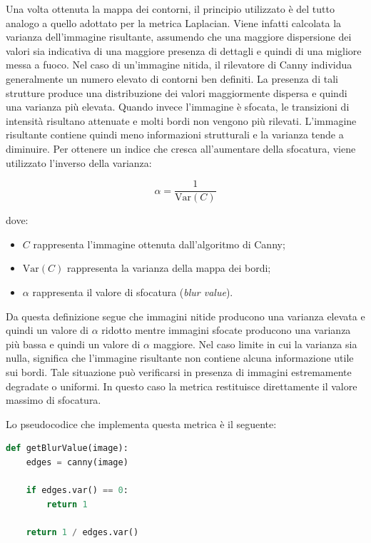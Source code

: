\documentclass[
    target=bach,
    aauheader=,
    style=
]{thud}
\begin{document}
Una volta ottenuta la mappa dei contorni, il principio utilizzato è del tutto analogo a quello adottato per la metrica Laplacian. Viene infatti calcolata la varianza dell'immagine risultante, assumendo che una maggiore dispersione dei valori sia indicativa di una maggiore presenza di dettagli e quindi di una migliore messa a fuoco. Nel caso di un'immagine nitida, il rilevatore di Canny individua generalmente un numero elevato di contorni ben definiti. La presenza di tali strutture produce una distribuzione dei valori maggiormente dispersa e quindi una varianza più elevata. Quando invece l'immagine è sfocata, le transizioni di intensità risultano attenuate e molti bordi non vengono più rilevati. L'immagine risultante contiene quindi meno informazioni strutturali e la varianza tende a diminuire. Per ottenere un indice che cresca all'aumentare della sfocatura, viene utilizzato l'inverso della varianza:

\begin{equation}
\alpha = \frac{1}{\mathrm{Var}(C)}
\end{equation}

dove:

\begin{itemize}
    \item $C$ rappresenta l'immagine ottenuta dall'algoritmo di Canny;
    \item $\mathrm{Var}(C)$ rappresenta la varianza della mappa dei bordi;
    \item $\alpha$ rappresenta il valore di sfocatura (\textit{blur value}).
\end{itemize}

Da questa definizione segue che immagini nitide producono una varianza elevata e quindi un valore di $\alpha$ ridotto mentre immagini sfocate producono una varianza più bassa e quindi un valore di $\alpha$ maggiore. Nel caso limite in cui la varianza sia nulla, significa che l'immagine risultante non contiene alcuna informazione utile sui bordi. Tale situazione può verificarsi in presenza di immagini estremamente degradate o uniformi. In questo caso la metrica restituisce direttamente il valore massimo di sfocatura.

Lo pseudocodice che implementa questa metrica è il seguente:

\begin{lstlisting}[language=python]
def getBlurValue(image):
    edges = canny(image)

    if edges.var() == 0:
        return 1

    return 1 / edges.var()
\end{lstlisting}
\end{document}

